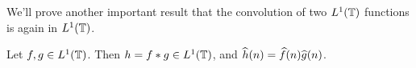   We'll prove another important result that the convolution of two $L^1(\mathbb T)$ functions is again in $L^1(\mathbb T)$.
  \begin{proposition}
    \label{prop:convolution_is_in_L1}
  Let $f, g \in L^1(\mathbb T)$. Then $h = f*g \in L^1(\mathbb T)$, and $\widehat{h}(n) = \widehat{f}(n)\widehat{g}(n)$.
  \end{proposition}

